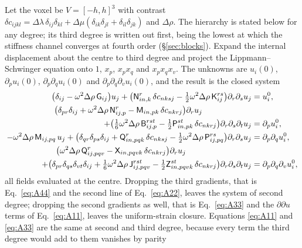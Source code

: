 \documentclass[11pt,a4paper]{article}
\begin{document}
Let the voxel be $V=[-h,h]^3$ with contrast
$\delta c_{ijkl}=\Delta\lambda\,\delta_{ij}\delta_{kl}+\Delta\mu(\delta_{ik}\delta_{jl}+\delta_{il}\delta_{jk})$
and $\Delta\rho$. The hierarchy is stated below for any degree; its third degree is written out
first, being the lowest at which the stiffness channel converges at fourth order (\S\ref{sec:blocks}).
Expand the internal displacement about the centre to third degree and project the
Lippmann--Schwinger equation onto $1$, $x_p$, $x_px_q$ and $x_px_qx_v$. The unknowns are $u_i(0)$,
$\partial_pu_i(0)$, $\partial_p\partial_qu_i(0)$ and $\partial_p\partial_q\partial_vu_i(0)$, and the
result is the closed system
\begin{align}
\bigl(\delta_{ij}-\omega^2\Delta\rho\,\mathsf G_{ij}\bigr)u_j
  +\bigl(\mathsf N^{r}_{in,k}\,\delta c_{nksj}-\tfrac12\omega^2\Delta\rho\,\mathsf K^{rs}_{ij}\bigr)
  \partial_r\partial_su_j
  &= u^0_i, \label{eq:A11}\\
\bigl(\delta_{pr}\delta_{ij}+\omega^2\Delta\rho\,\mathsf N^{r}_{ij,p}
  -\mathsf M_{in,pk}\,\delta c_{nkrj}\bigr)\partial_ru_j\qquad\qquad\qquad& \notag\\
  +\bigl(\tfrac16\omega^2\Delta\rho\,\mathsf B^{rst}_{ij,p}
  -\tfrac12\mathsf P^{st}_{in,pk}\,\delta c_{nkrj}\bigr)\partial_r\partial_s\partial_tu_j
  &= \partial_pu^0_i, \label{eq:A22}\\
-\omega^2\Delta\rho\,\mathsf M_{ij,pq}\,u_j
  +\bigl(\delta_{qr}\delta_{ps}\delta_{ij}+\mathsf Q^{r}_{in,pqk}\,\delta c_{nksj}
  -\tfrac12\omega^2\Delta\rho\,\mathsf P^{rs}_{ij,pq}\bigr)\partial_r\partial_su_j
  &= \partial_p\partial_qu^0_i, \label{eq:A33}\\
\bigl(\omega^2\Delta\rho\,\mathsf Q^{r}_{ij,pqv}-\mathsf X_{in,pqvk}\,\delta c_{nkrj}\bigr)\partial_ru_j
  \qquad\qquad\qquad\qquad& \notag\\
  +\bigl(\delta_{pr}\delta_{qs}\delta_{vt}\delta_{ij}+\tfrac16\omega^2\Delta\rho\,\mathsf J^{rst}_{ij,pqv}
  -\tfrac12\mathsf Z^{st}_{in,pqvk}\,\delta c_{nkrj}\bigr)\partial_r\partial_s\partial_tu_j
  &= \partial_p\partial_q\partial_vu^0_i, \label{eq:A44}
\end{align}
all fields evaluated at the centre. Dropping the third gradients, that is Eq.~\eqref{eq:A44} and the
second line of Eq.~\eqref{eq:A22}, leaves the system of second degree; dropping the second gradients
as well, that is Eq.~\eqref{eq:A33} and the $\partial\partial u$ terms of Eq.~\eqref{eq:A11}, leaves
the uniform-strain closure. Equations \eqref{eq:A11} and \eqref{eq:A33} are the same at second and
third degree, because every term the third degree would add to them vanishes by parity
\end{document}
